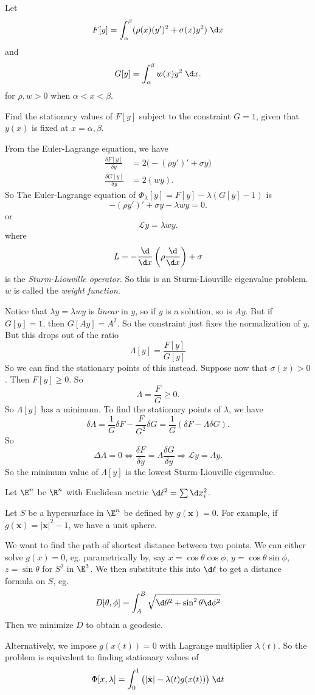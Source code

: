 \documentclass[a4paper]{article}
\begin{document}
\begin{eg}
  Let 
  \[
    F[y] = \int_\alpha^\beta (\rho(x)(y')^2 + \sigma(x)y^2)\;\d x
  \]
  and
  \[
    G[y] = \int_\alpha^\beta w(x)y^2\;\d x.
  \]
  for $\rho, w> 0$ when $\alpha < x < \beta$.

  Find the stationary values of $F[y]$ subject to the constraint $G = 1$, given that $y(x)$ is fixed at $x = \alpha, \beta$.

  From the Euler-Lagrange equation, we have
  \begin{align*}
    \frac{\delta F[y]}{\delta y} &= 2\big(-(\rho y')' + \sigma y\big)\\
    \frac{\delta G[y]}{\delta y} &= 2 (wy).
  \end{align*}
  So The Euler-Lagrange equation of $\Phi_\lambda [y] = F[y] - \lambda(G[y] - 1)$ is
  \[
    -(\rho y')' + \sigma y - \lambda wy = 0.
  \]
  or
  \[
    \mathcal{L}y = \lambda wy.
  \]
  where
  \[
    L = -\frac{\d}{\d x}\left(\rho\frac{\d}{\d x}\right) + \sigma
  \]
  is the \emph{Sturm-Liouville operator}. So this is an Sturm-Liouville eigenvalue problem. $w$ is called the \emph{weight function}.

  Notice that $\lambda y = \lambda wy$ is \emph{linear} in $y$, so if $y$ is a solution, so is $Ay$. But if $G[y ] = 1$, then $G[Ay] = A^2$. So the constraint just fixes the normalization of $y$. But this drops out of the ratio
  \[
    \Lambda [y] = \frac{F[y]}{G[y]}
  \]
  So we can find the stationary points of this instead. Suppose now that $\sigma(x) > 0$. Then $F[y] \geq 0$. So
 \[
    \Lambda = \frac{F}{G} \geq 0.
  \]
  So $\Lambda[y]$ has a minimum. To find the stationary points of $\lambda$, we have
  \[
    \delta\Lambda = \frac{1}{G}\delta F - \frac{F}{G^2} \delta G = \frac{1}{G}(\delta F - \Lambda \delta G).
  \]
  So
  \[
    \Delta \Lambda = 0 \Leftrightarrow \frac{\delta F}{\delta y} = \Lambda \frac{\delta G}{\delta y} \Rightarrow \mathcal{L} y = \Lambda y.
  \]
  So the minimum value of $\Lambda[y]$ is the lowest Sturm-Liouville eigenvalue.
\end{eg}

\begin{eg}
  Let $\E^n$ be $\R^n$ with Euclidean metric $\d \ell^2 = \sum \d x_i^2$.

  Let $S$ be a hypersurface in $\E^n$ be defined by $g(\mathbf{x}) = 0$. For example, if $g(\mathbf{x}) = |\mathbf{x}|^2 - 1$, we have a unit sphere.

  We want to find the path of shortest distance between two points. We can either solve $g(x) = 0$, eg. parametrically by, say $x = \cos \theta \cos \phi$, $y = \cos \theta \sin \phi$, $z = \sin \theta$ for $S^2$ in $\E^3$. We then substitute this into $\d \ell$ to get a distance formula on $S$, eg.
  \[
    D[\theta, \phi] = \int_A^B \sqrt{\d \theta^2 + \sin^2 \theta \d \phi^2}
  \]
  Then we minimize $D$ to obtain a geodesic.

  Alternatively, we impose $g(x(t)) = 0$ with Lagrange multiplier $\lambda(t)$. So the problem is equivalent to finding stationary values of
  \[
    \Phi[x, \lambda] = \int_0^1 \big(|\dot{\mathbf{x}}| - \lambda(t) g(x(t))\big)\;\d t
  \]
\end{eg}
\end{document}
